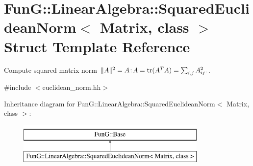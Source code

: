 \hypertarget{structFunG_1_1LinearAlgebra_1_1SquaredEuclideanNorm}{\section{Fun\-G\-:\-:Linear\-Algebra\-:\-:Squared\-Euclidean\-Norm$<$ Matrix, class $>$ Struct Template Reference}
\label{structFunG_1_1LinearAlgebra_1_1SquaredEuclideanNorm}
}


Compute squared matrix norm $ \|A\|^2 = A\negthinspace : \negthinspace A = \mathrm{tr}(A^TA) = \sum_{i,j} A_{ij}^2. $.  




{\ttfamily \#include $<$euclidean\-\_\-norm.\-hh$>$}

Inheritance diagram for Fun\-G\-:\-:Linear\-Algebra\-:\-:Squared\-Euclidean\-Norm$<$ Matrix, class $>$\-:\begin{figure}[H]
\begin{center}
\leavevmode
\includegraphics[height=2.000000cm]{structFunG_1_1LinearAlgebra_1_1SquaredEuclideanNorm}
\end{center}
\end{figure}
